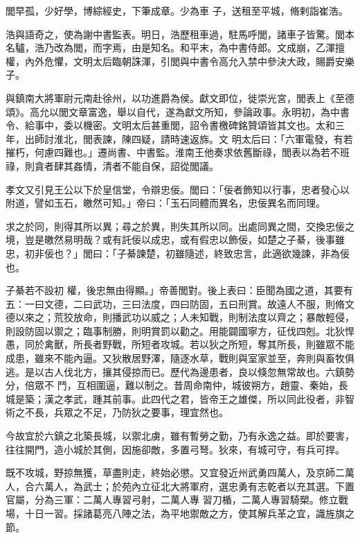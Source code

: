 \begin{pinyinscope}
 閭早孤，少好學，博綜經史，下筆成章。少為車
 子，送租至平城，脩剌詣崔浩。



 浩與語奇之，使為謝中書監表。明日，浩歷租車過，駐馬呼閭，諸車子皆驚。閭本名驢，浩乃改為閭，而字焉，由是知名。和平末，為中書侍郎。文成崩，乙渾擅權，內外危懼，文明太后臨朝誅渾，引閭與中書令高允入禁中參決大政，賜爵安樂子。



 與鎮南大將軍尉元南赴徐州，以功進爵為侯。獻文即位，徙崇光宮，閭表上《至德頌》。高允以閭文章富逸，舉以自代，遂為獻文所知，參論政事。永明初，為中書令、給事中，委以機密。文明太后甚重閭，詔令書檄碑銘贊頌皆其文也。太和三年，出師討淮北，閭表諫，陳四疑，請時速返旆。文
 明太后曰：「六軍電發，有若摧朽，何慮四難也。」遷尚書、中書監。淮南王他奏求依舊斷祿，閭表以為若不班祿，則貪者肆其姦情，清者不能自保，詔從閭議。



 孝文又引見王公以下於皇信堂，令辯忠佞。閭曰：「佞者飾知以行事，忠者發心以附道，譬如玉石，皦然可知。」帝曰：「玉石同體而異名，忠佞異名而同理。



 求之於同，則得其所以異；尋之於異，則失其所以同。出處同異之間，交換忠佞之境，豈是皦然易明哉？或有託佞以成忠，或有假忠以飾佞，如楚之子綦，後事雖忠，初非佞也？」閭曰：「子綦諫楚，初雖隨述，終致忠言，此適欲幾諫，非為佞也。



 子綦若不設初
 權，後忠無由得顯。」帝善閭對。後上表曰：臣聞為國之道，其要有五：一曰文德，二曰武功，三曰法度，四曰防固，五曰刑賞。故遠人不服，則脩文德以來之；荒狡放命，則播武功以威之；人未知戰，則制法度以齊之；暴敵輕侵，則設防固以禦之；臨事制勝，則明賞罰以勸之。用能闢國寧方，征伐四剋。北狄悍愚，同於禽獸，所長者野戰，所短者攻城。若以狄之所短，奪其所長，則雖眾不能成患，雖來不能內逼。又狄散居野澤，隨逐水草，戰則與室家並至，奔則與畜牧俱逃。是以古人伐北方，攘其侵掠而已。歷代為邊患者，良以倏忽無常故也。六鎮勢分，倍眾不
 鬥，互相圍逼，難以制之。昔周命南仲，城彼朔方，趙靈、秦始，長城是築；漢之孝武，踵其前事。此四代之君，皆帝王之雄傑，所以同此役者，非智術之不長，兵眾之不足，乃防狄之要事，理宜然也。



 今故宜於六鎮之北築長城，以禦北虜，雖有暫勞之勤，乃有永逸之益。即於要害，往往開門，造小城於其側，因施卻敵，多置弓弩。狄來，有城可守，有兵可捍。



 既不攻城，野掠無獲，草盡則走，終始必懲。又宜發近州武勇四萬人，及京師二萬人，合六萬人，為武士；於苑內立征北大將軍府，選忠勇有志乾者以充其選。下置官屬，分為三軍：二萬人專習弓射，二萬人專
 習刀楯，二萬人專習騎槊。修立戰場，十日一習。採諸葛亮八陣之法，為平地禦敵之方，使其解兵革之宜，識旌旗之節。




\end{pinyinscope}
